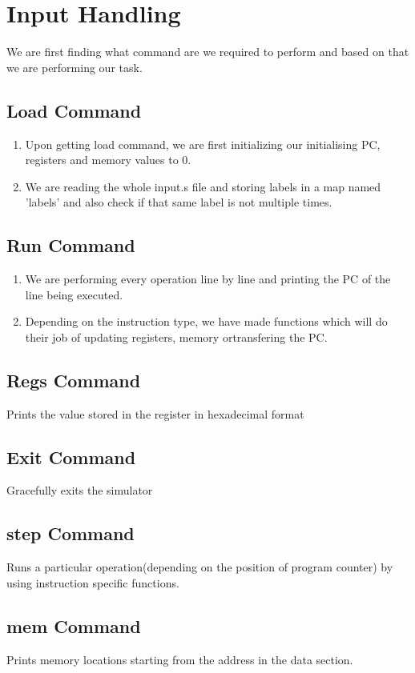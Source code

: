 \documentclass{article}
\begin{document}
	\section{Input Handling}
	We are first finding what command are we required to perform and based on that we are performing our task.
	\subsection{Load Command}
	\begin{enumerate}
		\item Upon getting load command, we are first initializing our initialising PC, registers and memory values to 0.
		\item We are reading the whole input.s file and storing labels in a map named 'labels' and also check if that same label is not multiple times.
	\end{enumerate}

	\subsection{Run Command}
	\begin{enumerate}
		\item We are performing every operation line by line and printing the PC of the line being executed.
		\item Depending on the instruction type, we have made functions which will do their job of updating registers, memory ortransfering the PC.
	\end{enumerate}
	\subsection{Regs Command}
	Prints the value stored in the register in hexadecimal format
	\subsection{Exit Command}
	Gracefully exits the simulator
	\subsection{step Command}
	Runs a particular operation(depending on the position of program counter) by using instruction specific functions.
	\subsection{mem Command}
	Prints memory locations starting from the address in the data section.
\end{document}
